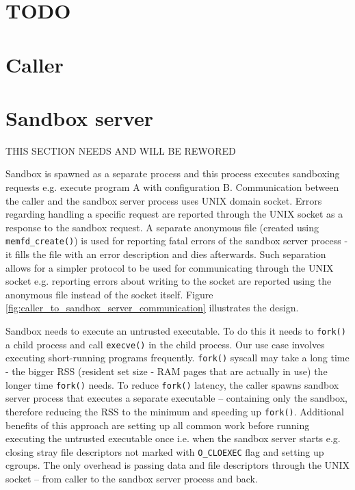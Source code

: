 \documentclass[en]{pracamgr}
\begin{document}
\section{TODO}

\section{Caller}

\section{Sandbox server}

THIS SECTION NEEDS AND WILL BE REWORED

Sandbox is spawned as a separate process and this process executes sandboxing requests e.g. execute program A with configuration B. Communication between the caller and the sandbox server process uses UNIX domain socket. Errors regarding handling a specific request are reported through the UNIX socket as a response to the sandbox request. A separate anonymous file (created using \texttt{memfd\_create()}) is used for reporting fatal errors of the sandbox server process - it fills the file with an error description and dies afterwards. Such separation allows for a simpler protocol to be used for communicating through the UNIX socket e.g. reporting errors about writing to the socket are reported using the anonymous file instead of the socket itself. Figure \ref{fig:caller_to_sandbox_server_communication} illustrates the design.


Sandbox needs to execute an untrusted executable. To do this it needs to \texttt{fork()} a child process and call \texttt{execve()} in the child process. Our use case involves executing short-running programs frequently. \texttt{fork()} syscall may take a long time \cite{redis-latency-generated-by-fork} - the bigger RSS (resident set size - RAM pages that are actually in use) the longer time \texttt{fork()} needs. To reduce \texttt{fork()} latency, the caller spawns sandbox server process that executes a separate executable -- containing only the sandbox, therefore reducing the RSS to the minimum and speeding up \texttt{fork()}. Additional benefits of this approach are setting up all common work before running executing the untrusted executable once i.e. when the sandbox server starts e.g. closing stray file descriptors not marked with \texttt{O\_CLOEXEC} flag and setting up cgroups. The only overhead is passing data and file descriptors through the UNIX socket -- from caller to the sandbox server process and back.
\end{document}
